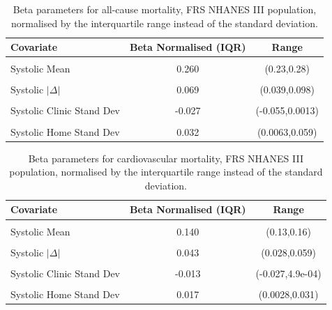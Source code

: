 \documentclass[
]{article}
\begin{document}
\begin{table}[!h]
\centering
\caption{\label{tab:iqrnormbetaRL3}Beta parameters for all-cause mortality, FRS NHANES III population, normalised by the interquartile range instead of the standard deviation.}
\centering
\begin{tabular}[t]{lcc}
\toprule
Covariate & Beta Normalised (IQR) & Range\\
\midrule
\cellcolor{gray!10}{Diastolic Mean} & \cellcolor{gray!10}{-0.022} & \cellcolor{gray!10}{(-0.05,0.0065)}\\
Systolic Mean & 0.260 & (0.23,0.28)\\
\cellcolor{gray!10}{Diastolic $|\Delta|$} & \cellcolor{gray!10}{0.060} & \cellcolor{gray!10}{(0.023,0.096)}\\
Systolic $|\Delta|$ & 0.069 & (0.039,0.098)\\
\cellcolor{gray!10}{Diastolic Clinic Stand Dev} & \cellcolor{gray!10}{0.003} & \cellcolor{gray!10}{(-0.037,0.043)}\\
Systolic Clinic Stand Dev & -0.027 & (-0.055,0.0013)\\
\cellcolor{gray!10}{Diastolic Home Stand Dev} & \cellcolor{gray!10}{0.021} & \cellcolor{gray!10}{(-0.01,0.052)}\\
Systolic Home Stand Dev & 0.032 & (0.0063,0.059)\\
\bottomrule
\end{tabular}
\end{table}

\begin{table}[!h]
\centering
\caption{\label{tab:iqrnormbetaRL4}Beta parameters for cardiovascular mortality, FRS NHANES III population, normalised by the interquartile range instead of the standard deviation.}
\centering
\begin{tabular}[t]{lcc}
\toprule
Covariate & Beta Normalised (IQR) & Range\\
\midrule
\cellcolor{gray!10}{Diastolic Mean} & \cellcolor{gray!10}{-0.019} & \cellcolor{gray!10}{(-0.034,-0.0036)}\\
Systolic Mean & 0.140 & (0.13,0.16)\\
\cellcolor{gray!10}{Diastolic $|\Delta|$} & \cellcolor{gray!10}{0.054} & \cellcolor{gray!10}{(0.035,0.072)}\\
Systolic $|\Delta|$ & 0.043 & (0.028,0.059)\\
\cellcolor{gray!10}{Diastolic Clinic Stand Dev} & \cellcolor{gray!10}{0.007} & \cellcolor{gray!10}{(-0.012,0.026)}\\
Systolic Clinic Stand Dev & -0.013 & (-0.027,4.9e-04)\\
\cellcolor{gray!10}{Diastolic Home Stand Dev} & \cellcolor{gray!10}{0.005} & \cellcolor{gray!10}{(-0.011,0.021)}\\
Systolic Home Stand Dev & 0.017 & (0.0028,0.031)\\
\bottomrule
\end{tabular}
\end{table}
\end{document}
